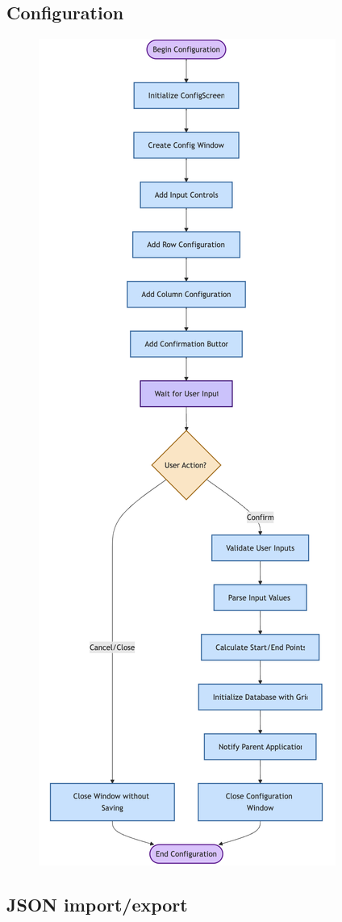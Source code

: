 \newpage

\subsection{Configuration}

\begin{figure}[htbp]
    \centering
    \includegraphics[width=0.4\linewidth]{Flowcharts/config1.png}

\end{figure}

\newpage

\subsection{JSON import/export}

